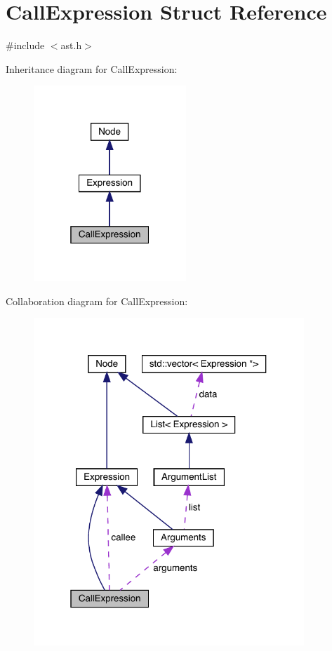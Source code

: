 \hypertarget{struct_call_expression}{}\section{Call\+Expression Struct Reference}
\label{struct_call_expression}


{\ttfamily \#include $<$ast.\+h$>$}



Inheritance diagram for Call\+Expression\+:
\nopagebreak
\begin{figure}[H]
\begin{center}
\leavevmode
\includegraphics[width=163pt]{struct_call_expression__inherit__graph}
\end{center}
\end{figure}


Collaboration diagram for Call\+Expression\+:
\nopagebreak
\begin{figure}[H]
\begin{center}
\leavevmode
\includegraphics[width=289pt]{struct_call_expression__coll__graph}
\end{center}
\end{figure}
